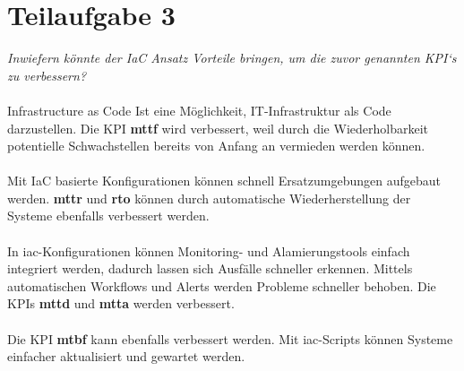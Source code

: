 \chapter{Teilaufgabe 3}

\textit{Inwiefern könnte der IaC Ansatz Vorteile bringen, um die zuvor genannten KPI‘s zu verbessern?}
\\
\\
Infrastructure as Code Ist eine Möglichkeit, IT-Infrastruktur als Code darzustellen. Die KPI \textbf{\ac{mttf}} wird verbessert, weil durch die Wiederholbarkeit potentielle Schwachstellen bereits von Anfang an vermieden werden können.
\\
\\
Mit IaC basierte Konfigurationen können schnell Ersatzumgebungen aufgebaut werden.
\textbf{\ac{mttr}} und \textbf{\ac{rto}} können durch automatische Wiederherstellung der Systeme ebenfalls verbessert werden.
\\
\\
In \ac{iac}-Konfigurationen können Monitoring- und Alamierungstools einfach integriert werden, dadurch lassen sich Ausfälle schneller erkennen.
Mittels automatischen Workflows und Alerts werden Probleme schneller behoben. 
Die KPIs \textbf{\ac{mttd}} und \textbf{\ac{mtta}} werden verbessert.
\\
\\
Die KPI \textbf{\ac{mtbf}} kann ebenfalls verbessert werden. Mit \ac{iac}-Scripts können Systeme einfacher aktualisiert und gewartet werden.
